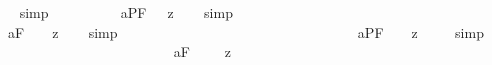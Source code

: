 \begin{isabellebody}
\isadelimproof
\ %
\endisadelimproof
%
\isatagproof
{}\isamarkupfalse%
\ simp\ \isamarkupfalse%
%
\endisatagproof
{\isafoldproof}%
%
\isadelimproof
%
\endisadelimproof
\ \ \ \ \ \ \ \isanewline
{}\isamarkupfalse%
\ a{}{}{\isacharunderscore}{}{\isacharunderscore}PF{\isacharcolon}\ {\isachardoublequoteopen}{\isacharbrackleft}{\isasymbox}\ {\isacharcomma}{\isasymphi}{\isacharcomma}\ {\isasymrightarrow}\isactrlsup z\ {\isacharcomma}{\isasymphi}{\isacharcomma}{\isacharbrackright}{\isachardoublequoteclose}%
\isadelimproof
\ %
\endisadelimproof
%
\isatagproof
{}\isamarkupfalse%
\ simp\ \isamarkupfalse%
%
\endisatagproof
{\isafoldproof}%
%
\isadelimproof
%
\endisadelimproof
\ \ \ \ \ \ \ \ \ \ \ \ \ \ \ \ \ \ \ \ \ \ \ \ \ \ \ \ \ \ \ \isanewline
{}\isamarkupfalse%
\ a{}{}{\isacharunderscore}{}{\isacharunderscore}F{\isacharcolon}\ \ {\isachardoublequoteopen}{\isacharbrackleft}{\isasymbox}\ {\isacharsemicolon}{\isasymphi}{\isacharsemicolon}\ {\isasymrightarrow}\isactrlsup z\ {\isacharsemicolon}{\isasymphi}{\isacharsemicolon}{\isacharbrackright}{\isachardoublequoteclose}%
\isadelimproof
\ %
\endisadelimproof
%
\isatagproof
{}\isamarkupfalse%
\ simp\ \isamarkupfalse%
%
\endisatagproof
{\isafoldproof}%
%
\isadelimproof
%
\endisadelimproof
\ \ \ \ \ \ \ \ \ \ \ \ \ \ \ \ \ \ \ \ \ \ \ \ \ \ \ \ \ \ \ \isanewline
{}\isamarkupfalse%
\ a{}{}{\isacharunderscore}{}{\isacharunderscore}PF{\isacharcolon}\ {\isachardoublequoteopen}{\isacharbrackleft}{\isasymbox}\ {\isacharparenleft}{\isasymdiamond}\ {\isacharcomma}{\isasymphi}{\isacharcomma}{\isacharparenright}\ {\isasymrightarrow}\isactrlsup z\ {\isacharparenleft}{\isasymdiamond}\ {\isacharcomma}{\isasymphi}{\isacharcomma}{\isacharparenright}{\isacharbrackright}{\isachardoublequoteclose}%
\isadelimproof
\ %
\endisadelimproof
%
\isatagproof
{}\isamarkupfalse%
\ simp\ \isamarkupfalse%
%
\endisatagproof
{\isafoldproof}%
%
\isadelimproof
%
\endisadelimproof
\ \ \ \ \ \ \ \ \ \ \ \ \ \ \ \ \ \ \ \ \ \ \ \isanewline
{}\isamarkupfalse%
\ a{}{}{\isacharunderscore}{}{\isacharunderscore}F{\isacharcolon}\ \ {\isachardoublequoteopen}{\isacharbrackleft}{\isasymbox}\ {\isacharparenleft}{\isasymdiamond}\ {\isacharsemicolon}{\isasymphi}{\isacharsemicolon}{\isacharparenright}\ {\isasymrightarrow}\isactrlsup z\ {\isacharparenleft}{\isasymdiamond}\ {\isacharsemicolon}{\isasymphi}{\isacharsemicolon}{\isacharparenright}{\isacharbrackright}{\isachardoublequoteclose}%

\end{isabellebody}
